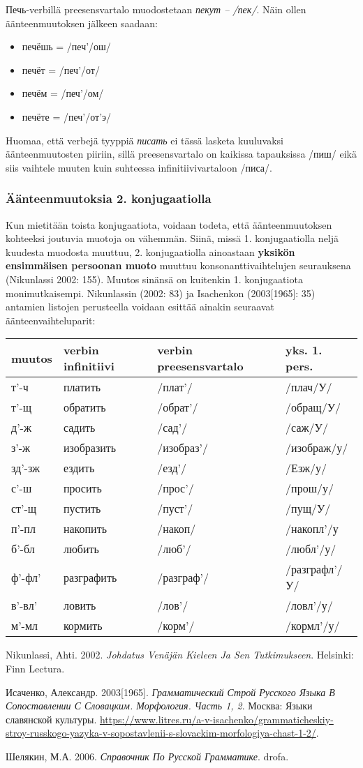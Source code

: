 \documentclass[]{scrartcl}
\providecommand{\tightlist}{%
  \setlength{\itemsep}{0pt}\setlength{\parskip}{0pt}}
\begin{document}
Печь-verbillä preesensvartalo muodostetaan \emph{пекут -- /пек/}. Näin
ollen äänteenmuutoksen jälkeen saadaan:

\begin{itemize}
\tightlist
\item
  печёшь = /печ'/ош/
\item
  печёт = /печ'/от/
\item
  печём = /печ'/ом/
\item
  печёте = /печ'/от'э/
\end{itemize}

Huomaa, että verbejä tyyppiä \emph{писать} ei tässä lasketa kuuluvaksi
äänteenmuutosten piiriin, sillä preesensvartalo on kaikissa tapauksissa
/пиш/ eikä siis vaihtele muuten kuin suhteessa infinitiivivartaloon
/писа/.

\subsubsection{Äänteenmuutoksia 2.
konjugaatiolla}\label{uxe4uxe4nteenmuutoksia-2.-konjugaatiolla}

Kun mietitään toista konjugaatiota, voidaan todeta, että
äänteenmuutoksen kohteeksi joutuvia muotoja on vähemmän. Siinä, missä 1.
konjugaatiolla neljä kuudesta muodosta muuttuu, 2. konjugaatiolla
ainoastaan \textbf{yksikön ensimmäisen persoonan muoto} muuttuu
konsonanttivaihtelujen seurauksena (Nikunlassi 2002: 155). Muutos
sinänsä on kuitenkin 1. konjugaatiota monimutkaisempi. Nikunlassin
(2002: 83) ja Isachenkon (2003{[}1965{]}: 35) antamien listojen
perusteella voidaan esittää ainakin seuraavat äänteenvaihteluparit:

\begin{longtable}[c]{@{}llll@{}}
\toprule
muutos & verbin infinitiivi & verbin preesensvartalo & yks. 1.
pers.\tabularnewline
\midrule
\endhead
т'-ч & платить & /плат'/ & /плач/У/\tabularnewline
т'-щ & обратить & /обрат'/ & /обращ/У/\tabularnewline
д'-ж & садить & /сад'/ & /саж/У/\tabularnewline
з'-ж & изобразить & /изобраз'/ & /изображ/у/\tabularnewline
зд'-зж & ездить & /езд'/ & /Езж/у/\tabularnewline
с'-ш & просить & /прос'/ & /прош/у/\tabularnewline
ст'-щ & пустить & /пуст'/ & /пущ/У/\tabularnewline
п'-пл & накопить & /накоп/ & /накопл'/у\tabularnewline
б'-бл & любить & /люб'/ & /любл'/у/\tabularnewline
ф'-фл' & разграфить & /разграф'/ & /разграфл'/У/\tabularnewline
в'-вл' & ловить & /лов'/ & /ловл'/у/\tabularnewline
м'-мл & кормить & /корм'/ & /кормл'/у/\tabularnewline
\bottomrule
\end{longtable}

Nikunlassi, Ahti. 2002. \emph{Johdatus Venäjän Kieleen Ja Sen
Tutkimukseen}. Helsinki: Finn Lectura.

Исаченко, Александр. 2003{[}1965{]}. \emph{Грамматический Строй Русского
Языка В Сопоставлении С Словацким. Морфология. Часть 1, 2}. Москва:
Языки славянской культуры.
\url{https://www.litres.ru/a-v-isachenko/grammaticheskiy-stroy-russkogo-yazyka-v-sopostavlenii-s-slovackim-morfologiya-chast-1-2/}.

Шелякин, М.А. 2006. \emph{Справочник По Русской Грамматике}. drofa.
\end{document}
